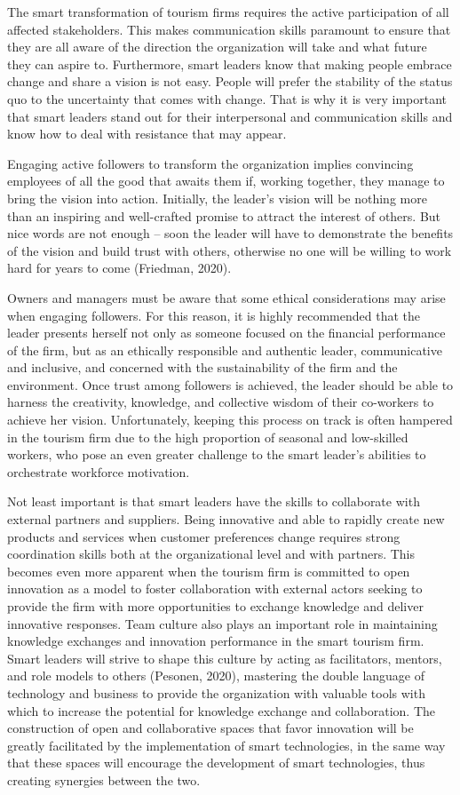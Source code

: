 \documentclass[
  letterpaper,
  DIV=11,
  numbers=noendperiod]{scrreprt}
\begin{document}
The smart transformation of tourism firms requires the active
participation of all affected stakeholders. This makes communication
skills paramount to ensure that they are all aware of the direction the
organization will take and what future they can aspire to. Furthermore,
smart leaders know that making people embrace change and share a vision
is not easy. People will prefer the stability of the status quo to the
uncertainty that comes with change. That is why it is very important
that smart leaders stand out for their interpersonal and communication
skills and know how to deal with resistance that may appear.

Engaging active followers to transform the organization implies
convincing employees of all the good that awaits them if, working
together, they manage to bring the vision into action. Initially, the
leader's vision will be nothing more than an inspiring and well-crafted
promise to attract the interest of others. But nice words are not enough
-- soon the leader will have to demonstrate the benefits of the vision
and build trust with others, otherwise no one will be willing to work
hard for years to come (Friedman, 2020).

Owners and managers must be aware that some ethical considerations may
arise when engaging followers. For this reason, it is highly recommended
that the leader presents herself not only as someone focused on the
financial performance of the firm, but as an ethically responsible and
authentic leader, communicative and inclusive, and concerned with the
sustainability of the firm and the environment. Once trust among
followers is achieved, the leader should be able to harness the
creativity, knowledge, and collective wisdom of their co-workers to
achieve her vision. Unfortunately, keeping this process on track is
often hampered in the tourism firm due to the high proportion of
seasonal and low-skilled workers, who pose an even greater challenge to
the smart leader's abilities to orchestrate workforce motivation.

Not least important is that smart leaders have the skills to collaborate
with external partners and suppliers. Being innovative and able to
rapidly create new products and services when customer preferences
change requires strong coordination skills both at the organizational
level and with partners. This becomes even more apparent when the
tourism firm is committed to open innovation as a model to foster
collaboration with external actors seeking to provide the firm with more
opportunities to exchange knowledge and deliver innovative responses.
Team culture also plays an important role in maintaining knowledge
exchanges and innovation performance in the smart tourism firm. Smart
leaders will strive to shape this culture by acting as facilitators,
mentors, and role models to others (Pesonen, 2020), mastering the double
language of technology and business to provide the organization with
valuable tools with which to increase the potential for knowledge
exchange and collaboration. The construction of open and collaborative
spaces that favor innovation will be greatly facilitated by the
implementation of smart technologies, in the same way that these spaces
will encourage the development of smart technologies, thus creating
synergies between the two.
\end{document}
